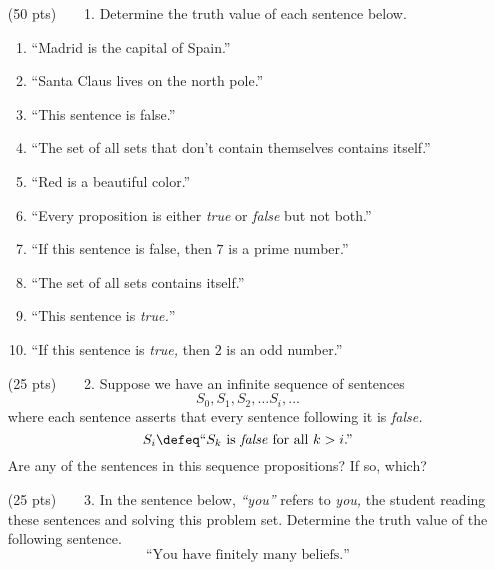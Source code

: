 \begin{enumerate}
  \item[(50 pts)~~~~1.]
    Determine the truth value of each sentence below.
    \begin{enumerate}
      \item
        ``Madrid is the capital of Spain.''
      \item
        ``Santa Claus lives on the north pole.''
      \item
        ``This sentence is false.''
      \item
        ``The set of all sets that don't contain themselves contains itself.''%
      \item
        ``Red is a beautiful color.''
      \item
        ``Every proposition is either \emph{true} or \emph{false} but not both.''
      \item
        ``If this sentence is false, then $7$ is a prime number.''%
      \item
        ``The set of all sets contains itself.''
      \item
        ``This sentence is \emph{true.}''
      \item
        ``If this sentence is \emph{true,} then $2$ is an odd number.''%
    \end{enumerate}

  \item[(25 pts)~~~~2.]
    Suppose we have an infinite sequence of sentences
    \begin{equation*}
      S_0, S_1, S_2, \dots S_i, \dots
    \end{equation*}
    where each sentence asserts that every sentence following it is \emph{false.}
    \begin{equation*}
      S_i \defeq \text{``}S_k \text{ is \emph{false} for all } k > i\text{.''}
    \end{equation*}
    Are%
    any of the sentences in this sequence propositions?
    If so, which?

  \item[(25 pts)~~~~3.]
    In the sentence below, \emph{``you''} refers to \emph{you}\emph{,} the student reading these sentences and solving this problem set.
    Determine the truth value of the following sentence.
    \begin{equation*}
      \text{``You have finitely many beliefs.''}
    \end{equation*}
\end{enumerate}


